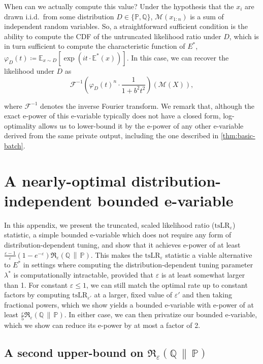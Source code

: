 \documentclass{article}
\newcommand{\Rdiv}[3][\eps]{%
  \mathfrak{R}_{#1}\!\left(#2\,\middle\|\,#3\right)%
}
\newcommand{\Null}{\mathbb{P}}
\newcommand{\E}{\mathbb{E}}
\newcommand{\Alt}{\mathbb{Q}}
\newcommand{\M}{\mathcal{M}}
\newcommand{\opt}{\Rdiv{\Alt}{\Null}}
\newcommand{\tsllr}{\text{tsLR}}
\newcommand{\eps}{\varepsilon}
\begin{document}
When can we actually compute this value? Under the hypothesis that the $x_i$ are drawn i.i.d.\ from some distribution $D \in \lbrace \Null, \Alt \rbrace$, $\M(x_{1:n})$ is a sum of independent random variables. So, a straightforward sufficient condition is the ability to compute the CDF of the untruncated likelihood ratio under $D$, which is in turn sufficient to compute the characteristic function of $E^*$, $\varphi_D(t) \coloneq \E_{x \sim D}[\exp(it\cdot\E^*(x))]$. In this case, we can recover the likelihood under $D$ as
\begin{equation}
    \mathcal{F}^{-1}\left( \varphi_D(t)^n \cdot \frac{1}{1+b^2t^2} \right)(\M(X)),
\end{equation}

where $\mathcal{F}^{-1}$ denotes the inverse Fourier transform. We remark that, although the exact e-power of this e-variable typically does not have a closed form, log-optimality allows us to lower-bound it by the e-power of any other e-variable derived from the same private output, including the one described in \cref{thm:basic-batch}.


\section{A nearly-optimal distribution-independent bounded e-variable}\label{app:distribution-independent}

In this appendix, we present the truncated, scaled likelihood ratio ($\tsllr_\eps$) statistic, a simple bounded e-variable which does not require any form of distribution-dependent tuning, and show that it achieves e-power of at least $\frac{\eps-1}{\eps}(1-e^{-\eps})\opt$. This makes the $\tsllr_\eps$ statistic a viable alternative to $E^*$ in settings where computing the distribution-dependent tuning parameter $\lambda^*$ is computationally intractable, provided that $\eps$ is at least somewhat larger than 1. For constant $\eps \leq 1$, we can still match the optimal rate up to constant factors by computing $\tsllr_{\eps'}$ at a larger, fixed value of $\eps'$ and then taking fractional powers, which we show yields a bounded e-variable with e-power of at least $\frac{\eps}{5}\opt$. In either case, we can then privatize our bounded e-variable, which we show can reduce its e-power by at most a factor of 2.

\subsection{A second upper-bound on $\opt$}
\label{sec:batch_upper_bound}
\end{document}

